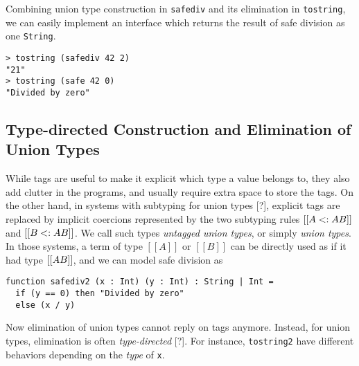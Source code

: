 Combining union type construction in \lstinline{safediv} and its elimination in
\lstinline{tostring}, we can easily implement an interface which returns the
result of safe division as one \lstinline{String}.

\begin{lstlisting}
> tostring (safediv 42 2)
"21"
> tostring (safe 42 0)
"Divided by zero"
\end{lstlisting}


\subsection{Type-directed Construction and Elimination of Union Types}





While tags are useful to make it explicit which type a value belongs to, they
also add clutter in the programs, and usually require extra space to store the tags. On
the other hand, in systems with subtyping for union types [?], explicit tags are
replaced by implicit coercions represented by the two subtyping rules $[[A <: A \/
B]]$ and $[[B <: A \/ B]]$. We call such types \textit{untagged union types}, or
simply \textit{union types}. In those systems, a term of type $[[A]]$ or $[[B]]$
can be directly used as if it had type $[[A \/ B]]$, and we can model safe
division as

\begin{lstlisting}
function safediv2 (x : Int) (y : Int) : String | Int =
  if (y == 0) then "Divided by zero"
  else (x / y)
\end{lstlisting}

Now elimination of union types cannot reply on tags anymore. Instead, for
union types, elimination is often \textit{type-directed} [?]. For instance,
\lstinline{tostring2} have different behaviors depending on the \textit{type} of
\lstinline{x}.


